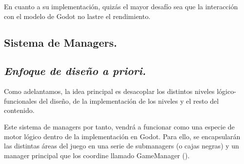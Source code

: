 En cuanto a su implementación, quizás el mayor desafío sea que la interacción con el modelo de Godot no lastre el rendimiento.

\subsection{Sistema de Managers.}\label{modelado:sistema-de-managers}
\subsection*{\noindent\normalfont\textit{Enfoque de diseño a priori.}}

Como adelantamos, la idea principal es desacoplar los distintos niveles lógico-funcionales del diseño, de la implementación de los niveles y el resto del contenido.

Este sistema de managers por tanto, vendrá a funcionar como una especie de motor lógico dentro de la implementación en Godot. Para ello, se encapsularán las distintas áreas del juego en una serie de submanagers (o cajas negras) y un manager principal que los coordine llamado GameManager ().

